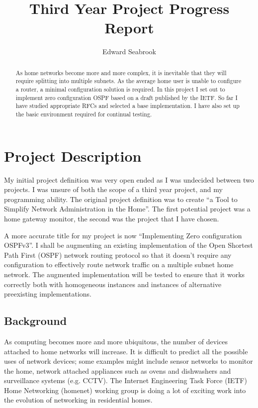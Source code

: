 \documentclass[12pt]{report}
\author{Edward Seabrook}
\title{Third Year Project Progress Report}
\begin{document}


\begin{abstract}
As home networks become more and more complex, it is inevitable that they will
require splitting into multiple subnets. As the average home user is unable to
configure a router, a minimal configuration solution is required. In this
project I set out to implement zero configuration OSPF based on a draft
published by the IETF. So far I have studied appropriate RFCs and selected a
base implementation. I have also set up the basic environment required for
continual testing.
\end{abstract}

\tableofcontents
\clearpage

\chapter{Project Description}
My initial project definition was very open ended as I was undecided between
two projects. I was unsure of both the scope of a third year project, and my
programming ability. The original project definition was to create
``a Tool to Simplify Network Administration in the Home''. The first potential
project was a home gateway monitor, the second was the project that
I have chosen. 

A more accurate title for my project is now ``Implementing Zero configuration
OSPFv3''. I shall be augmenting an existing implementation of the Open Shortest
Path First (OSPF)  network routing
protocol so that it doesn't require any configuration to effectively route
network traffic on a multiple subnet home network. The augmented implementation
will be tested to ensure that it works correctly both with homogeneous instances
and instances of alternative preexisting implementations. 

\section{Background}
As computing becomes more and more ubiquitous, the number of devices attached to
home networks will increase. It is difficult to predict all the possible uses of
network devices; some examples might include sensor networks to monitor the
home, network attached appliances such as ovens and dishwashers and surveillance
systems (e.g. CCTV). The Internet Engineering Task Force (IETF)
 Home Networking (homenet)
 working group is doing a lot of exciting
work into the evolution of networking in residential homes. 
\end{document}
